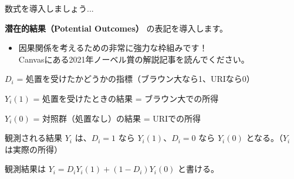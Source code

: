 \documentclass[11pt,handout]{beamer}
\newenvironment{wideitemize}{\itemize\addtolength{\itemsep}{10pt}}{\enditemize}
\begin{document}
\begin{frame}{数式を導入しましょう...}
\begin{wideitemize}
	\item \textbf{潜在的結果（Potential Outcomes）} の表記を導入します。
		\begin{itemize}
			\item 
			因果関係を考えるための非常に強力な枠組みです！\\
			Canvasにある2021年ノーベル賞の解説記事を読んでください。
		\end{itemize}
	
	\pause 
	\item $D_i$ = 処置を受けたかどうかの指標（ブラウン大なら1、URIなら0）
	
	\pause
	\item $Y_i(1)$ = 処置を受けたときの結果 = ブラウン大での所得
	\item $Y_i(0)$ = 対照群（処置なし）の結果 = URIでの所得
	
	\pause 
	\item 観測される結果 $Y_i$ は、$D_i = 1$ なら $Y_i(1)$、$D_i = 0$ なら $Y_i(0)$ となる。（$Y_i$ は実際の所得）
	
	\pause
	\item
	観測結果は $Y_i = D_i Y_i(1) + (1-D_i) Y_i(0)$ と書ける。
\end{wideitemize}

\end{frame}
\end{document}
